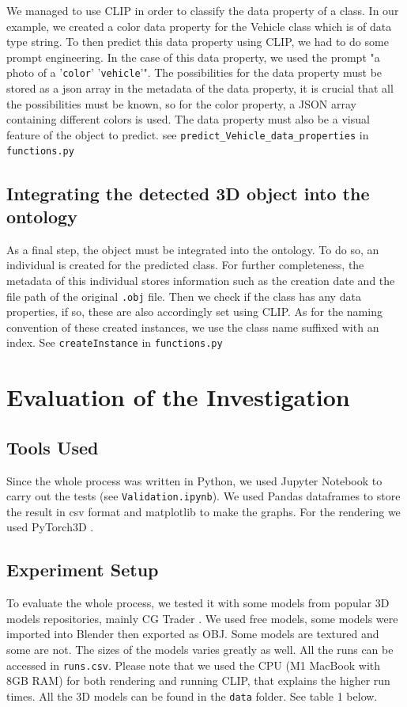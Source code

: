 \documentclass[a4paper,11pt,oneside]{article}
\begin{document}
We managed to use CLIP in order to classify the data property of a class. In our example, we created a color data property for the Vehicle class which is of data type string. To then predict this data property using CLIP, we had to do some prompt engineering. In the case of this data property, we used the prompt "a photo of a '\texttt{color}' '\texttt{vehicle}'". The possibilities for the data property must be stored as a json array in the metadata of the data property, it is crucial that all the possibilities must be known, so for the color property, a JSON array containing different colors is used. The data property must also be a visual feature of the object to predict. see \texttt{predict\_Vehicle\_data\_properties} in \texttt{functions.py}

\subsection{Integrating the detected 3D object into the ontology}
As a final step, the object must be integrated into the ontology. To do so, an individual is created for the predicted class. For further completeness, the metadata of this individual stores information such as the creation date and the file path of the original \texttt{.obj} file. Then we check if the class has any data properties, if so, these are also accordingly set using CLIP. As for the naming convention of these created instances, we use the class name suffixed with an index. See \texttt{createInstance} in \texttt{functions.py}

\section{Evaluation of the Investigation}
  
  \subsection{Tools Used}
  Since the whole process was written in Python, we used Jupyter Notebook \cite{Kluyver2016jupyter} to carry out the tests (see \texttt{Validation.ipynb}). We used Pandas dataframes \cite{mckinney-proc-scipy-2010} to store the result in csv format and matplotlib \cite{Hunter:2007} to make the graphs. For the rendering we used PyTorch3D \cite{ravi2020pytorch3d}.
  \subsection{Experiment Setup}
  To evaluate the whole process, we tested it with some models from popular 3D models repositories, mainly CG Trader \cite{cgtrader}. We used free models, some models were imported into Blender \cite{blender} then exported as OBJ. Some models are textured and some are not. The sizes of the models varies greatly as well. All the runs can be accessed in \texttt{runs.csv}. Please note that we used the CPU (M1 MacBook with 8GB RAM) for both rendering and running CLIP, that explains the higher run times. All the 3D models can be found in the \texttt{data} folder. See table 1 below.
\end{document}
